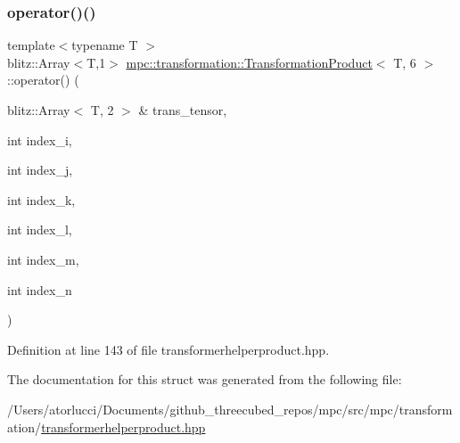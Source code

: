 \subsubsection{\texorpdfstring{operator()()}{operator()()}}
{\footnotesize\ttfamily template$<$typename T $>$ \\
blitz\+::\+Array$<$T,1$>$ \mbox{\hyperlink{structmpc_1_1transformation_1_1_transformation_product}{mpc\+::transformation\+::\+Transformation\+Product}}$<$ T, 6 $>$\+::operator() (\begin{DoxyParamCaption}\item[{blitz\+::\+Array$<$ T, 2 $>$ \&}]{trans\+\_\+tensor,  }\item[{int}]{index\+\_\+i,  }\item[{int}]{index\+\_\+j,  }\item[{int}]{index\+\_\+k,  }\item[{int}]{index\+\_\+l,  }\item[{int}]{index\+\_\+m,  }\item[{int}]{index\+\_\+n }\end{DoxyParamCaption})\hspace{0.3cm}{\ttfamily [inline]}}



Definition at line 143 of file transformerhelperproduct.\+hpp.



The documentation for this struct was generated from the following file\+:\begin{DoxyCompactItemize}
\item 
/\+Users/atorlucci/\+Documents/github\+\_\+threecubed\+\_\+repos/mpc/src/mpc/transformation/\mbox{\hyperlink{transformerhelperproduct_8hpp}{transformerhelperproduct.\+hpp}}\end{DoxyCompactItemize}
